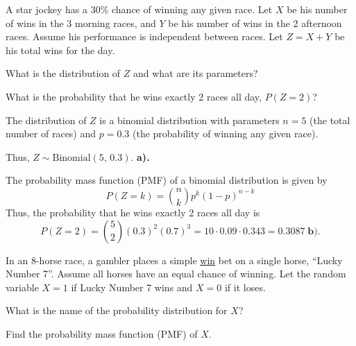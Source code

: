 \documentclass[a4paper, 10pt]{article}
\begin{document}
\begin{tosubmit}
\problem[7]
A star jockey has a 30\% chance of winning any given race.
Let \( X \) be his number of wins in the 3 morning races, and \( Y \) be his number of wins in the 2 afternoon races.
Assume his performance is independent between races.
Let \( Z = X + Y \) be his total wins for the day.

\begin{subproblems}
    \item What is the distribution of \( Z \) and what are its parameters?
    \item What is the probability that he wins exactly 2 races all day, \( P(Z = 2) \)?
\end{subproblems}

\par\noindent\submitsolution
The distribution of \( Z \) is a binomial distribution with parameters \( n = 5 \) (the total number of races)
and \( p = 0.3 \) (the probability of winning any given race).
\par\noindent Thus, \( \boxed{Z \sim \text{Binomial}(5,\, 0.3)} \). \textbf{a).}

\vspace{2mm}

\par\noindent The probability mass function (PMF) of a binomial distribution is given by
\[
    P(Z = k) = \binom{n}{k} p^k (1-p)^{n-k}
\]
Thus, the probability that he wins exactly 2 races all day is
\[
    P(Z = 2) = \binom{5}{2} (0.3)^2 (0.7)^3 = 10 \cdot 0.09 \cdot 0.343 = \boxed{0.3087} \; \textbf{b).}
\]
\end{tosubmit}

\pagebreak

\begin{problem}
In an 8-horse race, a gambler places a simple \underline{win} bet on a single horse, ``Lucky Number 7''.
Assume all horses have an equal chance of winning.
Let the random variable \( X = 1 \) if Lucky Number 7 wins and \( X = 0 \) if it loses.
\begin{subproblems}
    \item What is the name of the probability distribution for \( X \)?
    \item Find the probability mass function (PMF) of \( X \).
\end{subproblems}
\end{problem}
\end{document}
